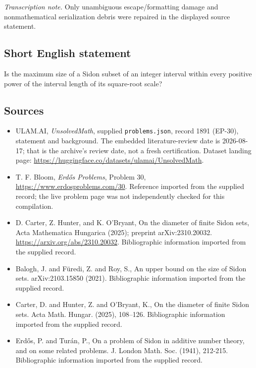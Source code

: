 \documentclass[11pt,a4paper]{article}
\begin{document}
{\small\emph{Transcription note.} Only unambiguous escape/formatting damage and nonmathematical serialization debris were repaired in the displayed source statement.}

\subsection{Short English statement}

Is the maximum size of a Sidon subset of an integer interval within every positive power of the interval length of its square-root scale?

\subsection{Sources}

{\small

\begin{itemize}

\item[\hypertarget{source:1891:1}{S1}] ULAM.AI, \emph{UnsolvedMath}, supplied \texttt{problems.json}, record 1891 (EP-30), statement and background. The embedded literature-review date is 2026-08-17; that is the archive’s review date, not a fresh certification. Dataset landing page: \url{https://huggingface.co/datasets/ulamai/UnsolvedMath}.

\item[\hypertarget{source:1891:2}{S2}] T. F. Bloom, \emph{Erdős Problems}, Problem 30, \url{https://www.erdosproblems.com/30}. Reference imported from the supplied record; the live problem page was not independently checked for this compilation.

\item[\hypertarget{source:1891:3}{S3}] D. Carter, Z. Hunter, and K. O'Bryant, On the diameter of finite Sidon sets, Acta Mathematica Hungarica (2025); preprint arXiv:2310.20032. \url{https://arxiv.org/abs/2310.20032}. Bibliographic information imported from the supplied record.

\item[\hypertarget{source:1891:4}{S4}] Balogh, J. and F\"{u}redi, Z. and Roy, S., An upper bound on the size of Sidon sets. arXiv:2103.15850 (2021). Bibliographic information imported from the supplied record.

\item[\hypertarget{source:1891:5}{S5}] Carter, D. and Hunter, Z. and O'Bryant, K., On the diameter of finite {S}idon sets. Acta Math. Hungar. (2025), 108--126. Bibliographic information imported from the supplied record.

\item[\hypertarget{source:1891:6}{S6}] Erd\H{o}s, P. and Tur\'{a}n, P., On a problem of Sidon in additive number theory, and on some related problems. J. London Math. Soc. (1941), 212-215. Bibliographic information imported from the supplied record.

\end{itemize}

}

\label{end:1891}
\end{document}

